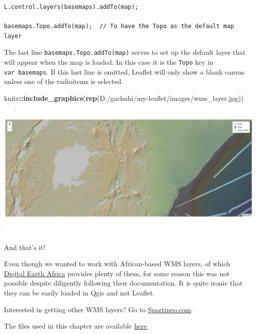 \documentclass[
]{book}
\newenvironment{Shaded}{\begin{snugshade}}{\end{snugshade}}
\newcommand{\FunctionTok}[1]{\textcolor[rgb]{0.13,0.29,0.53}{\textbf{#1}}}
\newcommand{\NormalTok}[1]{#1}
\newcommand{\SpecialCharTok}[1]{\textcolor[rgb]{0.81,0.36,0.00}{\textbf{#1}}}
\newcommand{\StringTok}[1]{\textcolor[rgb]{0.31,0.60,0.02}{#1}}
\begin{document}
\begin{verbatim}
L.control.layers(basemaps).addTo(map);

basemaps.Topo.addTo(map);  // To have the Topo as the default map layer
\end{verbatim}

The last line \texttt{basemaps.Topo.addTo(map)} serves to set up the default layer that will appear when the map is loaded. In this case it is the \texttt{Topo} key in \texttt{var\ basemaps}. If this last line is omitted, Leaflet will only show a blank canvas unless one of the radioitems is selected.

\begin{Shaded}
\begin{Highlighting}[]
\NormalTok{knitr}\SpecialCharTok{::}\FunctionTok{include\_graphics}\NormalTok{(}\FunctionTok{rep}\NormalTok{(}\StringTok{\textquotesingle{}D:/gachuhi/my{-}leaflet/images/wms\_layer.jpg\textquotesingle{}}\NormalTok{))}
\end{Highlighting}
\end{Shaded}

\includegraphics{../images/wms_layer.jpg}

And that's it!

Even though we wanted to work with African-based WMS layers, of which \href{https://training.digitalearthafrica.org/en/latest/OWS_tutorial.html}{Digital Earth Africa} provides plenty of them, for some reason this was not possible despite diligently following their documentation. It is quite ironic that they can be easily loaded in Qgis and not Leaflet.

Interested in getting other WMS layers? Go to \href{https://directory.spatineo.com/}{Spartineo.com}.

The files used in this chapter are available \href{https://github.com/sammigachuhi/my-leaflet-project/tree/main/my-leaflet-code/chapter-12-Web_map_service_layers}{here}.
\end{document}
